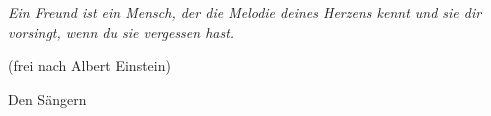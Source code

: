 \thispagestyle{empty}
\begin{center}
 \emph{Ein Freund ist ein Mensch, der die Melodie deines Herzens kennt und sie
       dir vorsingt, wenn du sie vergessen hast.}
 \begin{flushright}
 (frei nach Albert Einstein)
 \end{flushright}
\vspace{1cm} 
 Den Sängern
\end{center}

\cleardoublepage
